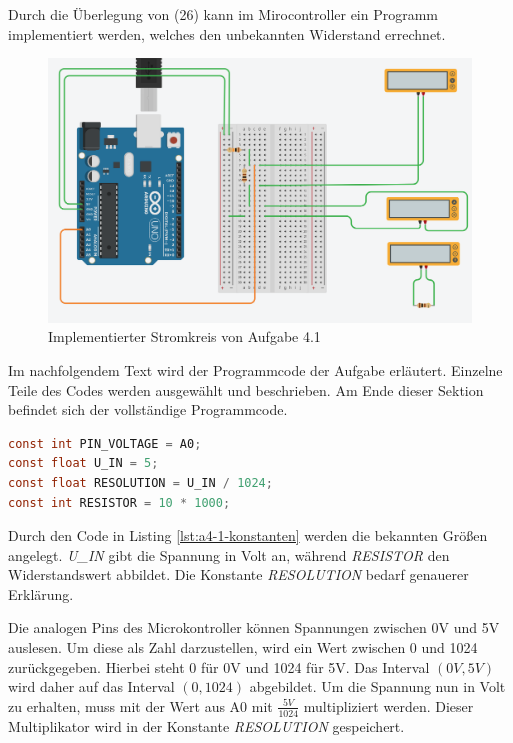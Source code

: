 Durch die Überlegung von (26) kann im Mirocontroller ein Programm implementiert werden, welches den unbekannten Widerstand errechnet.

\begin{figure}[ht]
\centering
\includegraphics[width=\textwidth]{pictures/a4-1-praktik.png}
\caption{Implementierter Stromkreis von Aufgabe 4.1}
\label{fig:a4-1-implemtierung}
\end{figure}

Im nachfolgendem Text wird der Programmcode der Aufgabe erläutert.
Einzelne Teile des Codes werden ausgewählt und beschrieben.
Am Ende dieser Sektion befindet sich der vollständige Programmcode.

\begin{lstlisting}[language=C,label={lst:a4-1-konstanten}, caption={Konstanten der Aufgabe 4.1}]
const int PIN_VOLTAGE = A0;
const float U_IN = 5;
const float RESOLUTION = U_IN / 1024;
const int RESISTOR = 10 * 1000;
\end{lstlisting}

Durch den Code in Listing \ref{lst:a4-1-konstanten} werden die bekannten Größen angelegt.
\textit{U\_IN} gibt die Spannung in Volt an, während \textit{RESISTOR} den Widerstandswert abbildet.
Die Konstante \textit{RESOLUTION} bedarf genauerer Erklärung.

Die analogen Pins des Microkontroller können Spannungen zwischen 0V und 5V auslesen.
Um diese als Zahl darzustellen, wird ein Wert zwischen 0 und 1024 zurückgegeben.
Hierbei steht 0 für 0V und 1024 für 5V.
Das Interval $(0V, 5V)$ wird daher auf das Interval $(0, 1024)$ abgebildet.
Um die Spannung nun in Volt zu erhalten, muss mit der Wert aus A0 mit $\frac{5V}{1024}$ multipliziert werden.
Dieser Multiplikator wird in der Konstante \textit{RESOLUTION} gespeichert.

